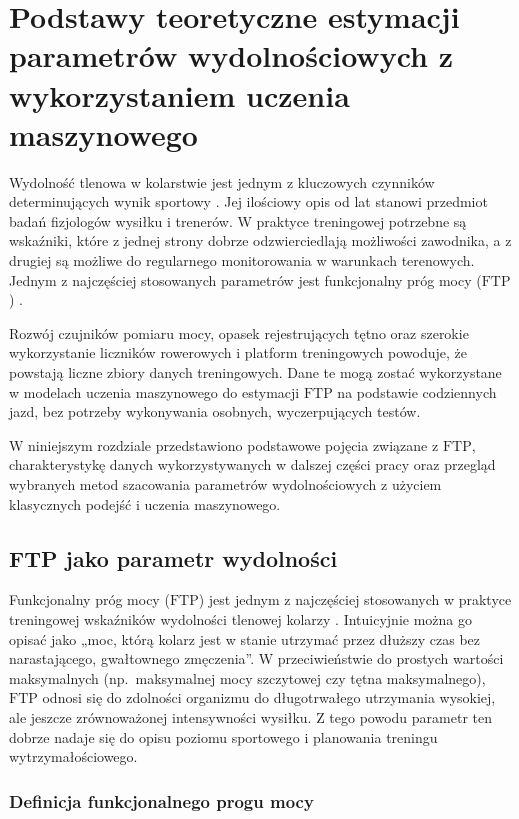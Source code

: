 


\chapter{Podstawy teoretyczne estymacji parametrów wydolnościowych z wykorzystaniem uczenia maszynowego}

Wydolność tlenowa w kolarstwie jest jednym z kluczowych czynników determinujących wynik sportowy \cite{borszcz2018ftp}.
Jej ilościowy opis od lat stanowi przedmiot badań fizjologów wysiłku i trenerów.
W praktyce treningowej potrzebne są wskaźniki, które z jednej strony dobrze odzwierciedlają możliwości zawodnika, a z drugiej są możliwe do regularnego monitorowania w warunkach terenowych.
Jednym z najczęściej stosowanych parametrów jest funkcjonalny próg mocy ($\mathrm{FTP}$) \cite{borszcz2018ftp,allen2019power}.

Rozwój czujników pomiaru mocy, opasek rejestrujących tętno oraz szerokie wykorzystanie liczników rowerowych i platform treningowych powoduje, że powstają liczne zbiory danych treningowych.
Dane te mogą zostać wykorzystane w modelach uczenia maszynowego do estymacji $\mathrm{FTP}$ na podstawie codziennych jazd, bez potrzeby wykonywania osobnych, wyczerpujących testów.

W niniejszym rozdziale przedstawiono podstawowe pojęcia związane z $\mathrm{FTP}$, charakterystykę danych wykorzystywanych w dalszej części pracy oraz przegląd wybranych metod szacowania parametrów wydolnościowych z użyciem klasycznych podejść i uczenia maszynowego.

\section{FTP jako parametr wydolności}

Funkcjonalny próg mocy ($\mathrm{FTP}$) jest jednym z najczęściej stosowanych w praktyce treningowej wskaźników wydolności tlenowej kolarzy \cite{borszcz2018ftp,allen2019power}.
Intuicyjnie można go opisać jako „moc, którą kolarz jest w stanie utrzymać przez dłuższy czas bez narastającego, gwałtownego zmęczenia”.
W przeciwieństwie do prostych wartości maksymalnych (np.\ maksymalnej mocy szczytowej czy tętna maksymalnego), $\mathrm{FTP}$ odnosi się do zdolności organizmu do długotrwałego utrzymania wysokiej, ale jeszcze zrównoważonej intensywności wysiłku.
Z tego powodu parametr ten dobrze nadaje się do opisu poziomu sportowego i planowania treningu wytrzymałościowego.

\subsection{Definicja funkcjonalnego progu mocy}

